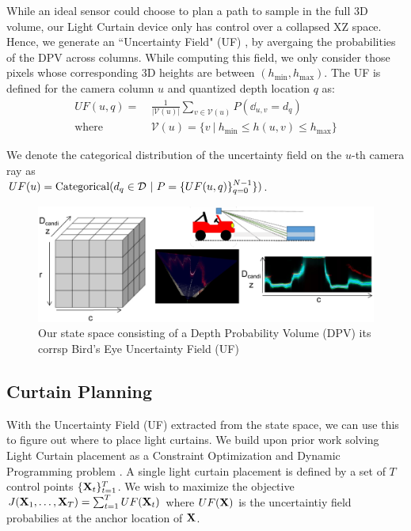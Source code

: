 While an ideal sensor could choose to plan a path to sample in the full 3D volume, our Light Curtain device only has control over a collapsed XZ  space. Hence, we generate an ``Uncertainty Field" (UF) \cite{yang2019inferring}, by avergaing the probabilities of the DPV across columns. While computing this field, we only consider those pixels whose corresponding 3D heights are between $(h_\text{min}, h_\text{max})$. The UF is defined for the camera column $u$ and quantized depth location $q$ as:
\begin{align}
   UF(u, q) =\ &\frac{1}{|\mathcal{V}(u)|}\sum_{v \in \mathcal{V}(u)} P(\dd_{u, v} = d_q)\nonumber\\
   \text{where } &\mathcal{V}(u) = \{v\ |\ h_\text{min} \leq h(u, v) \leq h_\text{max}\} 
   \label{eq:collapse}
\end{align}

We denote the categorical distribution of the uncertainty field on the $u$-th camera ray as \\$UF(u)=\text{Categorical}(d_q \in \D\ |\ P=\{UF(u, q)\}_{q=0}^{N-1}\})$. 

\begin{figure}[h]
   \centering
   \begin{minipage}{0.5\textwidth}
       \centering
       \includegraphics[width=1.0\textwidth]{figures/bev.pdf}
   \end{minipage}\hfill
   \centering
   \caption{Our state space consisting of a Depth Probability Volume (DPV) its corrsp Bird's Eye Uncertainty Field (UF)}
\end{figure}

\subsection{Curtain Planning}

With the Uncertainty Field (UF) extracted from the state space, we can use this to figure out where to place light curtains. We build upon prior work solving Light Curtain placement as a Constraint Optimization and Dynamic Programming problem \cite{Ancha_2020_ECCV}. A single light curtain placement is defined by a set of $T$ control points $\{\mathbf{X}_t\}_{t=1}^T$. We wish to maximize the objective $J(\mathbf{X}_1, \dots, \mathbf{X}_T) = \sum_{t=1}^T UF(\mathbf{X}_t)$ where $UF(\mathbf{X})$ is the uncertaintiy field probabilies at the anchor location of $\mathbf{X}$.

